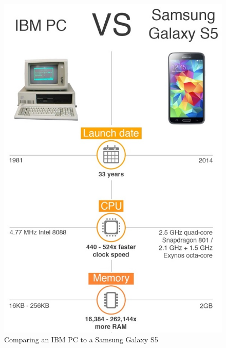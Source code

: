 \begin{figure}[!ht]
    \centering
    \includegraphics[scale=0.5]{document/chapters/chapter_1/images/ibm_vs_galaxy_s5.jpg}
    \caption{Comparing an IBM PC to a Samsung Galaxy S5 \cite{computing_power_comparison}}
    \label{fig:ibm_vs_galaxy_s5}
\end{figure}
